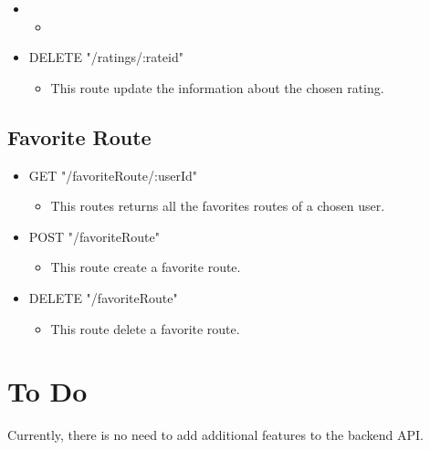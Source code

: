 \begin{itemize}
	\item 
	\begin{itemize}
		\item 
	\end{itemize}
\end{itemize}

\begin{itemize}
	\item DELETE "/ratings/:rateid"
	\begin{itemize}
		\item This route update the information about the chosen rating.
	\end{itemize}
\end{itemize}

\subsection{Favorite Route}
\begin{itemize}
	\item GET "/favoriteRoute/:userId"
	\begin{itemize}
		\item This routes returns all the favorites routes of a chosen user.
	\end{itemize}
\end{itemize}

\begin{itemize}
	\item POST "/favoriteRoute"
	\begin{itemize}
		\item This route create a favorite route.
	\end{itemize}
\end{itemize}

\begin{itemize}
	\item DELETE "/favoriteRoute"
	\begin{itemize}
		\item This route delete a favorite route.
	\end{itemize}
\end{itemize}

\section{To Do}

Currently, there is no need to add additional features to the backend API.

